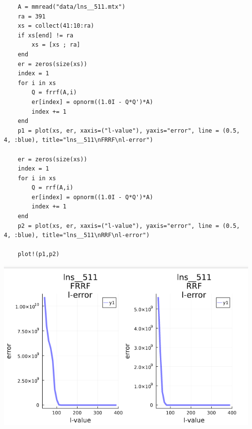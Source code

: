 \documentclass[11pt,a4paper]{article}
\theoremstyle{definition}
\begin{document}
	\begin{lstlisting}
	A = mmread("data/lns__511.mtx")
	ra = 391
	xs = collect(41:10:ra)
	if xs[end] != ra
	    xs = [xs ; ra]
	end
	er = zeros(size(xs))
	index = 1
	for i in xs 
	    Q = frrf(A,i)
	    er[index] = opnorm((1.0I - Q*Q')*A)
	    index += 1
	end
	p1 = plot(xs, er, xaxis=("l-value"), yaxis="error", line = (0.5, 4, :blue), title="lns__511\nFRRF\nl-error")
	
	er = zeros(size(xs))
	index = 1
	for i in xs 
	    Q = rrf(A,i)
	    er[index] = opnorm((1.0I - Q*Q')*A)
	    index += 1
	end
	p2 = plot(xs, er, xaxis=("l-value"), yaxis="error", line = (0.5, 4, :blue), title="lns__511\nRRF\nl-error")
	
	plot!(p1,p2)
	\end{lstlisting}
	\includegraphics[scale=0.5]{images/4.5_4.png}
\end{document}
